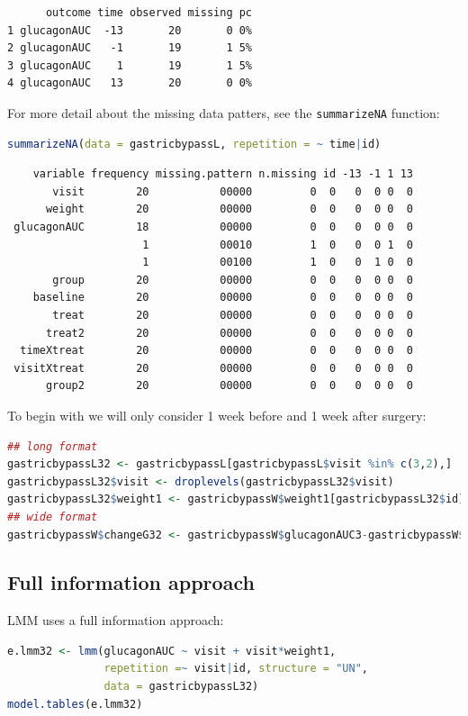 \documentclass[12pt]{article}
\begin{document}
\label{}
\begin{verbatim}
      outcome time observed missing pc
1 glucagonAUC  -13       20       0 0%
2 glucagonAUC   -1       19       1 5%
3 glucagonAUC    1       19       1 5%
4 glucagonAUC   13       20       0 0%
\end{verbatim}


For more detail about the missing data patters, see the \texttt{summarizeNA}
function:
\begin{lstlisting}[language=r,numbers=none]
summarizeNA(data = gastricbypassL, repetition = ~ time|id)
\end{lstlisting}

\label{}
\begin{verbatim}
    variable frequency missing.pattern n.missing id -13 -1 1 13
       visit        20           00000         0  0   0  0 0  0
      weight        20           00000         0  0   0  0 0  0
 glucagonAUC        18           00000         0  0   0  0 0  0
                     1           00010         1  0   0  0 1  0
                     1           00100         1  0   0  1 0  0
       group        20           00000         0  0   0  0 0  0
    baseline        20           00000         0  0   0  0 0  0
       treat        20           00000         0  0   0  0 0  0
      treat2        20           00000         0  0   0  0 0  0
  timeXtreat        20           00000         0  0   0  0 0  0
 visitXtreat        20           00000         0  0   0  0 0  0
      group2        20           00000         0  0   0  0 0  0
\end{verbatim}

To begin with we will only consider 1 week before and 1 week after
surgery:
\begin{lstlisting}[language=r,numbers=none]
## long format
gastricbypassL32 <- gastricbypassL[gastricbypassL$visit %in% c(3,2),]
gastricbypassL32$visit <- droplevels(gastricbypassL32$visit)
gastricbypassL32$weight1 <- gastricbypassW$weight1[gastricbypassL32$id]
## wide format
gastricbypassW$changeG32 <- gastricbypassW$glucagonAUC3-gastricbypassW$glucagonAUC2
\end{lstlisting}

\clearpage
\subsection{Full information approach}
\label{sec:org2d88a98}

LMM uses a full information approach:
\begin{lstlisting}[language=r,numbers=none]
e.lmm32 <- lmm(glucagonAUC ~ visit + visit*weight1,
               repetition =~ visit|id, structure = "UN",
               data = gastricbypassL32)
model.tables(e.lmm32)
\end{lstlisting}
\end{document}
